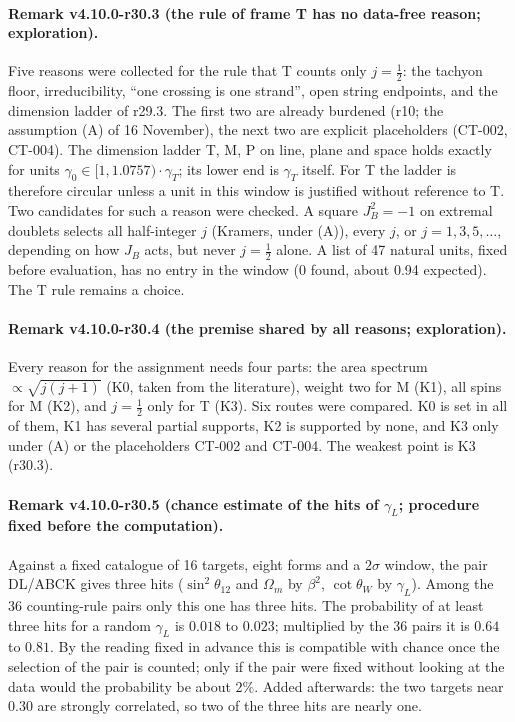 \paragraph{Remark v4.10.0-r30.3 (the rule of frame T has no data-free reason; exploration).}
Five reasons were collected for the rule that T counts only \(j=\tfrac12\): the tachyon floor, irreducibility, ``one crossing is one strand'', open
string endpoints, and the dimension ladder of r29.3.  The first two are already burdened (r10; the assumption (A) of 16 November), the next two are
explicit placeholders (CT-002, CT-004).  The dimension ladder T, M, P on line, plane and space holds exactly for units
\(\gamma_0\in[1,1.0757)\cdot\gamma_T\); its lower end is \(\gamma_T\) itself.  For T the ladder is therefore circular unless a unit in this window is
justified without reference to T.  Two candidates for such a reason were checked.  A square \(J_B^2=-1\) on extremal doublets selects all
half-integer \(j\) (Kramers, under (A)), every \(j\), or \(j=1,3,5,\dots\), depending on how \(J_B\) acts, but never \(j=\tfrac12\) alone.  A list
of 47 natural units, fixed before evaluation, has no entry in the window (0 found, about 0.94 expected).  The T rule remains a choice.

\paragraph{Remark v4.10.0-r30.4 (the premise shared by all reasons; exploration).}
Every reason for the assignment needs four parts: the area spectrum \(\propto\sqrt{j(j+1)}\) (K0, taken from the literature), weight two for M (K1),
all spins for M (K2), and \(j=\tfrac12\) only for T (K3).  Six routes were compared.  K0 is set in all of them, K1 has several partial supports, K2
is supported by none, and K3 only under (A) or the placeholders CT-002 and CT-004.  The weakest point is K3 (r30.3).

\paragraph{Remark v4.10.0-r30.5 (chance estimate of the hits of \(\gamma_L\); procedure fixed before the computation).}
Against a fixed catalogue of 16 targets, eight forms and a \(2\sigma\) window, the pair DL/ABCK gives three hits (\(\sin^2\theta_{12}\) and
\(\Omega_m\) by \(\beta^2\), \(\cot\theta_W\) by \(\gamma_L\)).  Among the 36 counting-rule pairs only this one has three hits.  The probability of at
least three hits for a random \(\gamma_L\) is \(0.018\) to \(0.023\); multiplied by the 36 pairs it is \(0.64\) to \(0.81\).  By the reading fixed
in advance this is compatible with chance once the selection of the pair is counted; only if the pair were fixed without looking at the data would
the probability be about \(2\%\).  Added afterwards: the two targets near \(0.30\) are strongly correlated, so two of the three hits are nearly one.

